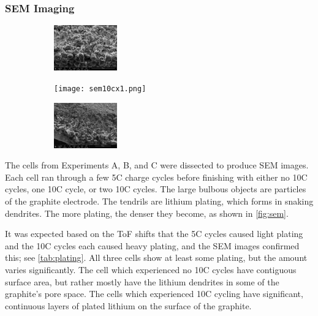 \subsubsection{SEM Imaging}
\begin{figure}[t!]\label{fig:sem}
\centering
\caption{SEM images of cells after experiencing a few 5C cycles and either zero (left), one (center), or two (right) 10C cycles.}
     \begin{subfigure}
         \centering
         \includegraphics[width=0.3\textwidth]{sem5c.png}
     \end{subfigure}
     \hfill
     \begin{subfigure}
         \centering
         \texttt{[image: sem10cx1.png]}
     \end{subfigure}
     \hfill
     \begin{subfigure}
         \centering
         \includegraphics[width=0.3\textwidth]{sem10cx2.png}
     \end{subfigure}
\end{figure}

The cells from Experiments A, B, and C were dissected to produce SEM images. Each cell ran through a few 5C charge cycles before finishing with either no 10C cycles, one 10C cycle, or two 10C cycles. 
The large bulbous objects are particles of the graphite electrode. The tendrils are lithium plating, which forms in snaking dendrites. 
The more plating, the denser they become, as shown in \hyperref[fig:sem]{\cref{fig:sem}}.  

It was expected based on the ToF shifts that the 5C cycles caused light plating and the 10C cycles each caused heavy plating, and the SEM images confirmed this; see \hyperref[tab:plating]{\cref{tab:plating}}. All three cells show at least some plating, but the amount varies significantly. The cell which experienced no 10C cycles have contiguous surface area, but rather mostly have the lithium dendrites in some of the graphite's pore space. The cells which experienced 10C cycling have significant, continuous layers of plated lithium on the surface of the graphite.

